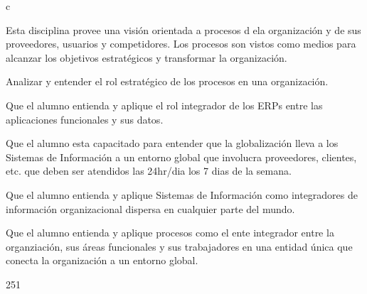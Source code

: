 c\begin{syllabus}


\begin{justification}
Esta disciplina provee una visión orientada a procesos d ela organización y de sus proveedores, usuarios y competidores. Los procesos son vistos como medios para alcanzar los objetivos estratégicos y transformar la organización.
\end{justification}

\begin{goals}
\item Analizar y entender el rol estratégico de los procesos en una organización.
\item Que el alumno entienda y aplique el rol integrador de los ERPs entre las aplicaciones funcionales y sus datos.
\item Que el alumno esta capacitado para entender que la globalización lleva a los Sistemas de Información a un entorno global que involucra proveedores, clientes, etc. que deben ser atendidos las 24hr/dia los 7 dias de la semana.
\item Que el alumno entienda y aplique Sistemas de Información como integradores de información organizacional dispersa en cualquier parte del mundo.
\item Que el alumno entienda y aplique procesos como el ente integrador entre la organziación, sus áreas funcionales y sus trabajadores en una entidad única que conecta la organización a un entorno global.
\end{goals}

\begin{outcomes}
\end{outcomes}

\begin{unit}{\LUTWOOHONEDef}{\LUTWOOHONEBib}{25}{1}
   \begin{topics}
   	\item \OMCONETopicTWOxONExEIGHT
		\begin{subtopics}
			\item \OMCONETopicTWOxONExEIGHTxONE
			\item \OMCONETopicTWOxONExEIGHTxTWO
			\item \OMCONETopicTWOxONExEIGHTxTHREE
			\item \OMCONETopicTWOxONExEIGHTxFOUR
		\end{subtopics}
   \end{topics}
	\LUTWOOHONEGoal
\end{unit}


\end{syllabus}
